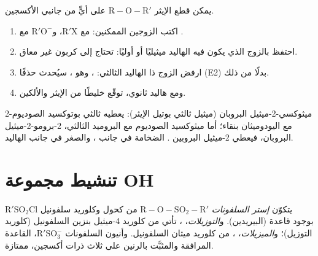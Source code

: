 \begin{method}\label{met:b1:alcohol-activation:williamson-choice}
يمكن قطع الإيثر $\mathrm{R{-}O{-}R'}$ على أيٍّ من جانبي الأكسجين.
\begin{enumerate}
  \item اكتب الزوجين الممكنين:  مع $\mathrm{R'X}$،
        و$\mathrm{R'O^-}$ مع .
  \item احتفظ بالزوج الذي يكون فيه الهاليد ميثيليًا أو أوليًا:  تحتاج إلى
        كربون غير معاق.
  \item ارفض الزوج ذا الهاليد الثالثي: ، وهو ،
        سيُحدث حذفًا (E2) بدلًا من ذلك.
  \item ومع هاليد ثانوي، توقّع خليطًا من الإيثر والألكين.
\end{enumerate}
\end{method}

\begin{example}\label{ex:b1:alcohol-activation:williamson}
2-ميثوكسي-2-ميثيل البروبان (ميثيل ثالثي بوتيل الإيثر): يعطيه ثالثي بوتوكسيد الصوديوم
مع اليودوميثان بنقاء؛ أما ميثوكسيد الصوديوم مع البروميد
الثالثي، 2-برومو-2-ميثيل البروبان، فيعطي 2-ميثيل البروبين . الضخامة في جانب
، والصغر في جانب الهاليد.
\end{example}

\section{تنشيط مجموعة OH}

\begin{definition}\label{def:b1:alcohol-activation:sulfonate}
يتكوّن \emph{إستر السلفونات} $\mathrm{R{-}O{-}SO_2{-}R'}$
من كحول وكلوريد سلفونيل $\mathrm{R'SO_2Cl}$ بوجود
قاعدة (البيريدين). و\emph{التوزيلات}، ، تأتي
من كلوريد 4-ميثيل بنزين السلفونيل (كلوريد التوزيل)؛
و\emph{الميزيلات}، ، من كلوريد ميثان السلفونيل.
وأنيون السلفونات $\mathrm{R'SO_3^-}$، القاعدة المرافقة 
والمثبَّت بالرنين على ثلاث ذرات أكسجين،  ممتازة.
\end{definition}

